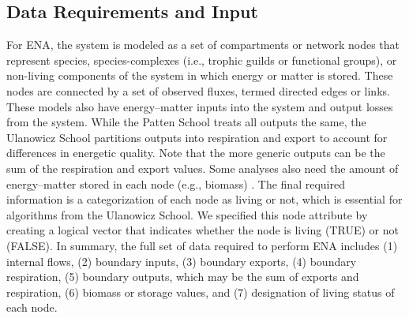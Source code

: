 \documentclass[11pt]{article}
\begin{document}
\begin{spacing}{2}
\subsection{Data Requirements and Input}
For ENA, the system is modeled as a set of compartments or network nodes that
represent species, species-complexes (i.e., trophic guilds or
functional groups), or non-living components of the system in which
energy or matter is stored.  These nodes are connected by a set of
observed fluxes, termed directed edges or links.  %
These models also have energy--matter inputs into the system
 and output losses from the system.
While the Patten School treats all outputs the same, the Ulanowicz
School partitions outputs into respiration %
and export 
to account for differences in energetic quality. Note that the more
generic outputs can be the sum of the respiration and export values.
Some analyses also need the amount of energy--matter stored in each
node (e.g., biomass)%
.  The final required information is a categorization of each node as
living or not, which is essential for algorithms from the Ulanowicz
School.  We specified this node attribute by creating a logical vector
that indicates whether the %
node is living (TRUE) or not (FALSE).  In summary, the full set of
data required to perform ENA includes (1) internal flows, (2) boundary
inputs, (3) boundary exports, (4) boundary respiration, (5) boundary
outputs, which may be the sum of exports and respiration, (6) biomass
or storage values, and (7) designation of living status of each node.


\end{spacing}
\end{document}
